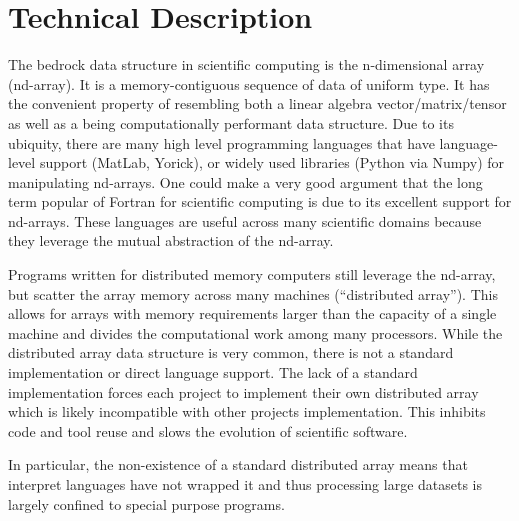 \documentclass[letterpaper,11pt]{article}
\begin{document}

\section*{Technical Description}

The bedrock data structure in scientific computing is the n-dimensional array (nd-array).  It is a memory-contiguous sequence of data of uniform type.  It has the convenient property of resembling both a linear algebra vector/matrix/tensor as well as a being computationally performant data structure.  Due to its ubiquity, there are many high level programming languages that have language-level support (MatLab\cite{matlab}, Yorick\cite{Munro1995}), or widely used libraries (Python\cite{CPython} via Numpy\cite{Oliphant2006}) for manipulating nd-arrays.  One could make a very good argument that the long term popular of Fortran for scientific computing is due to its excellent support for nd-arrays.  These languages are useful across many scientific domains because they leverage the mutual abstraction of the nd-array.

Programs written for distributed memory computers still leverage the nd-array, but scatter the array memory across many machines (``distributed array'').  This allows for arrays with memory requirements larger than the capacity of a single machine and divides the computational work among many processors.  While the distributed array data structure is very common, there is not a standard implementation or direct language support.  The lack of a standard implementation forces each project to implement their own distributed array which is likely incompatible with other projects implementation.  This inhibits code and tool reuse and slows the evolution of scientific software.

In particular, the non-existence of a standard distributed array means that interpret languages have not wrapped it and thus processing large datasets is largely confined to special purpose programs.
\end{document}
